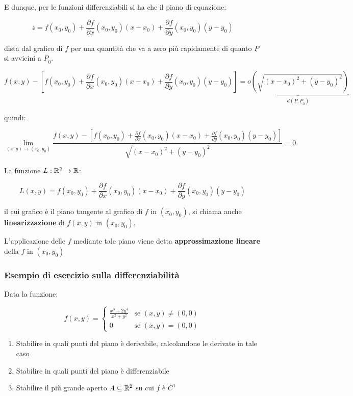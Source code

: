 E dunque, per le funzioni differenziabili si ha che il piano di equazione:

\[
    z= f(x_0,y_0) + \frac{\partial f}{\partial x}(x_0,y_0)(x-x_0) + \frac{\partial f}{\partial y}(x_0,y_0) (y-y_0)
\]

dista dal grafico di \(f\) per una quantità che va a zero più rapidamente di quanto \(\underline{P}\) si avvicini a \(\underline{P}_0\).

\[
    f(x,y) - \left[ f(x_0,y_0) + \frac{\partial f}{\partial x}(x_0,y_0) (x-x_0) + \frac{\partial f}{\partial y}(x_0,y_0) (y-y_0) \right] = \underbrace{o\left( \sqrt{{(x-x_0)}^{2}+{(y-y_0)}^{2}} \right)}_\text{\(d(\underline{P},\underline{P}_0)\)}
\]

\filbreak{}
quindi:

\[
    \lim_{ (x,y) \to (x_0,y_0) } \frac{f(x,y) - \left[ f(x_0,y_0) + \frac{\partial f}{\partial x}(x_0,y_0) (x-x_0) + \frac{\partial f}{\partial y}(x_0,y_0) (y-y_0) \right] }{\sqrt{{(x-x_0)}^{2}+{(y-y_0)}^{2}}}= 0
\]

La funzione \(L: \mathbb{R}^{2} \rightarrow \mathbb{R} \):

\[
    L(x,y) = f(x_0,y_0) + \frac{\partial f}{\partial x}(x_0,y_0) (x-x_0) + \frac{\partial f}{\partial y}(x_0,y_0) (y-y_0)
\]

il cui grafico è il piano tangente al grafico di \(f\) in \((x_0,y_0)\), si chiama anche \textbf{linearizzazione} di \(f(x,y)\) in \((x_0,y_0)\).

L'applicazione delle \(f\) mediante tale piano viene detta \textbf{approssimazione lineare} della \(f\) in \((x_0,y_0)\)

\pagebreak
\subsubsection{Esempio di esercizio sulla differenziabilità}

Data la funzione:

\[
    f(x,y) = \begin{cases}
        \displaystyle \frac{x^{3}+2y^{4}}{x^{2}+y^{2}} & \text{se \((x,y) \neq (0,0)\)} \\
        0                                              & \text{se \((x,y) = (0,0)\)}
    \end{cases}
\]

\begin{enumerate}
    \item Stabilire in quali punti del piano è derivabile, calcolandone le derivate in tale caso
    \item Stabilire in quali punti del piano è differenziabile
    \item Stabilire il più grande aperto \(A \subseteq \mathbb{R}^{2}\) su cui \(f\) è \(C^{1}\)
\end{enumerate}

